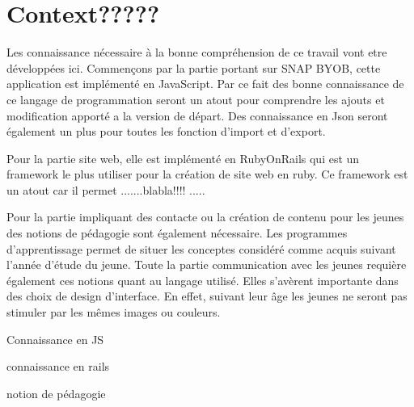 \section{Context?????}
Les connaissance nécessaire à la bonne compréhension de ce travail vont etre développées ici. Commençons par la partie portant sur SNAP BYOB, cette application est implémenté en JavaScript. Par ce fait des bonne connaissance de ce langage de programmation seront un atout pour comprendre les ajouts et modification apporté a la version de départ. Des connaissance en Json seront également un plus pour toutes les fonction d'import et d'export.

Pour la partie site web, elle est implémenté en RubyOnRails qui est un framework le plus utiliser pour la création de site web en ruby. Ce framework est un atout car il permet .......blabla!!!! .....

Pour la partie impliquant des contacte ou la création de contenu pour les jeunes des notions de pédagogie sont également nécessaire. Les programmes d'apprentissage permet de situer les conceptes considéré comme acquis suivant l'année d'étude du jeune. Toute la partie communication avec les jeunes requière également ces notions quant au langage utilisé. Elles s'avèrent importante dans des choix de design d'interface. En effet, suivant leur âge les jeunes ne seront pas stimuler par les mêmes images ou couleurs.

Connaissance en JS

connaissance en rails

notion de pédagogie
